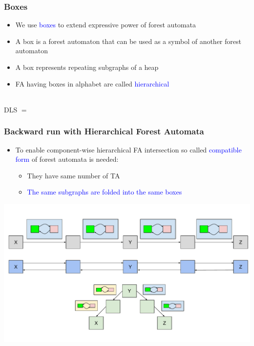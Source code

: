 \documentclass{beamer}
\newcommand{\hlbl}[1]{\textcolor{blue}{#1}}
\begin{document}
\begin{frame}
\frametitle{Boxes}

\begin{itemize}
		\item We use \hlbl{boxes} to extend expressive power of forest automata
		\item A box is a forest automaton that can be used as a symbol of another forest automaton
		\item A box represents repeating subgraphs of a heap
		\item FA having boxes in alphabet are called \hlbl{hierarchical}
	\end{itemize}
		\vspace{-0.8cm}
		\centering \\
		\vspace{0.7cm}
		\centering DLS $=$ \\
		\vspace{-0.8cm}
		\centering 
\end{frame}



\begin{frame}
\frametitle{Backward run with Hierarchical Forest Automata}
	
		   	\begin{itemize}
				\item To enable component-wise hierarchical FA intersection
					so called \hlbl{compatible form} of forest automata is needed:
				\begin{itemize}
					\item They have same number of TA
					\item \hlbl{The same subgraphs are folded into the same boxes}
				\end{itemize}
			\end{itemize}

	\begin{center}
		\includegraphics[scale=0.4]{ex/cp.pdf}
	\end{center}

\end{frame}
\end{document}
